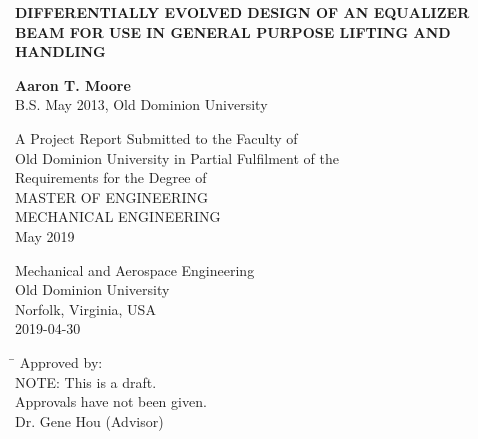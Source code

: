 \begin{titlepage}
   \begin{center}
       \vspace*{1cm}
       
       \Large
	   {\uppercase{\textbf{Differentially Evolved design of an Equalizer Beam for use in General Purpose Lifting and Handling}}\par}
       \normalsize

       \vspace{2.5cm}
 
       \textbf{Aaron T. Moore}\\
       B.S. May 2013, Old Dominion University
 
       \vfill
 
       A Project Report Submitted to the Faculty of\\
       Old Dominion University in Partial Fulfilment of the\\
       Requirements for the Degree of\\
       \vspace{1.0cm}
       \uppercase{Master of Engineering}\\
       \vspace{1em}
       \uppercase{Mechanical Engineering}\\
       \vspace{1em}
       {May 2019}\\

 
       \vspace{0.8cm}
 
 
       Mechanical  and Aerospace Engineering\\
       Old Dominion University\\
       Norfolk, Virginia, USA\\
       2019-04-30
 
   \end{center}
   \vspace{1cm}
   \begin{tabbing}
      \hspace*{11cm}\= \kill
      \>Approved by:\\
      \>NOTE: This is a draft.\\
      \>Approvals have not been given.\\
      \>Dr. Gene Hou (Advisor)
   \end{tabbing}
\end{titlepage}
